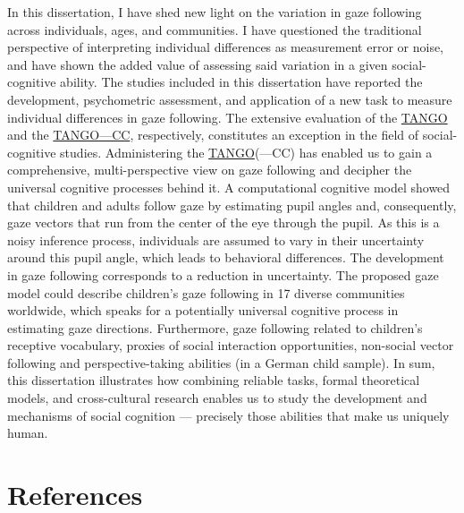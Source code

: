 \documentclass[
]{scrbook}
\begin{document}
In this dissertation, I have shed new light on the variation in gaze following across individuals, ages, and communities. I have questioned the traditional perspective of interpreting individual differences as measurement error or noise, and have shown the added value of assessing said variation in a given social-cognitive ability. The studies included in this dissertation have reported the development, psychometric assessment, and application of a new task to measure individual differences in gaze following. The extensive evaluation of the \hyperref[acronyms_TANGO]{TANGO} and the \hyperref[acronyms_TANGOux2014CC]{TANGO---CC}, respectively, constitutes an exception in the field of social-cognitive studies. Administering the \hyperref[acronyms_TANGO]{TANGO}(---CC) has enabled us to gain a comprehensive, multi-perspective view on gaze following and decipher the universal cognitive processes behind it. A computational cognitive model showed that children and adults follow gaze by estimating pupil angles and, consequently, gaze vectors that run from the center of the eye through the pupil. As this is a noisy inference process, individuals are assumed to vary in their uncertainty around this pupil angle, which leads to behavioral differences. The development in gaze following corresponds to a reduction in uncertainty. The proposed gaze model could describe children's gaze following in 17 diverse communities worldwide, which speaks for a potentially universal cognitive process in estimating gaze directions. Furthermore, gaze following related to children's receptive vocabulary, proxies of social interaction opportunities, non-social vector following and perspective-taking abilities (in a German child sample). In sum, this dissertation illustrates how combining reliable tasks, formal theoretical models, and cross-cultural research enables us to study the development and mechanisms of social cognition --- precisely those abilities that make us uniquely human.

\backmatter

\chapter{References}\label{references}
\end{document}

